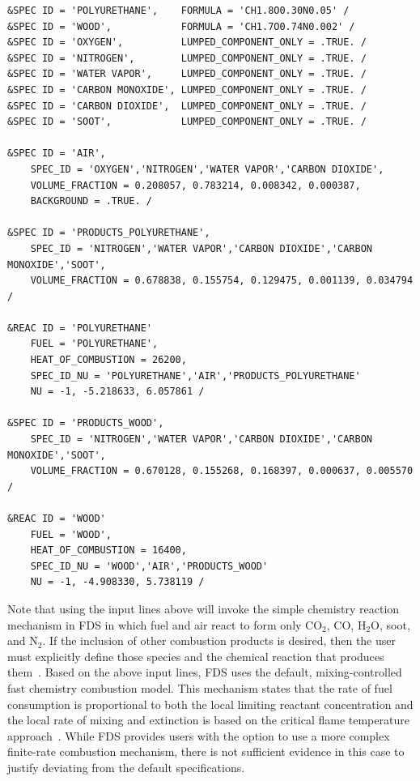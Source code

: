 \documentclass[12pt,oneside]{book}
\begin{document}
\begin{lstlisting}[basicstyle=\ttfamily\scriptsize]
&SPEC ID = 'POLYURETHANE',    FORMULA = 'CH1.8O0.30N0.05' /
&SPEC ID = 'WOOD',            FORMULA = 'CH1.7O0.74N0.002' /
&SPEC ID = 'OXYGEN',          LUMPED_COMPONENT_ONLY = .TRUE. /
&SPEC ID = 'NITROGEN',        LUMPED_COMPONENT_ONLY = .TRUE. /
&SPEC ID = 'WATER VAPOR',     LUMPED_COMPONENT_ONLY = .TRUE. /
&SPEC ID = 'CARBON MONOXIDE', LUMPED_COMPONENT_ONLY = .TRUE. /
&SPEC ID = 'CARBON DIOXIDE',  LUMPED_COMPONENT_ONLY = .TRUE. /
&SPEC ID = 'SOOT',            LUMPED_COMPONENT_ONLY = .TRUE. /

&SPEC ID = 'AIR',
    SPEC_ID = 'OXYGEN','NITROGEN','WATER VAPOR','CARBON DIOXIDE',
    VOLUME_FRACTION = 0.208057, 0.783214, 0.008342, 0.000387,
    BACKGROUND = .TRUE. /

&SPEC ID = 'PRODUCTS_POLYURETHANE',
    SPEC_ID = 'NITROGEN','WATER VAPOR','CARBON DIOXIDE','CARBON MONOXIDE','SOOT',
    VOLUME_FRACTION = 0.678838, 0.155754, 0.129475, 0.001139, 0.034794 /

&REAC ID = 'POLYURETHANE'
    FUEL = 'POLYURETHANE',
    HEAT_OF_COMBUSTION = 26200,
    SPEC_ID_NU = 'POLYURETHANE','AIR','PRODUCTS_POLYURETHANE'
    NU = -1, -5.218633, 6.057861 /

&SPEC ID = 'PRODUCTS_WOOD',
    SPEC_ID = 'NITROGEN','WATER VAPOR','CARBON DIOXIDE','CARBON MONOXIDE','SOOT',
    VOLUME_FRACTION = 0.670128, 0.155268, 0.168397, 0.000637, 0.005570 /

&REAC ID = 'WOOD'
    FUEL = 'WOOD',
    HEAT_OF_COMBUSTION = 16400,
    SPEC_ID_NU = 'WOOD','AIR','PRODUCTS_WOOD'
    NU = -1, -4.908330, 5.738119 /
\end{lstlisting}

Note that using the input lines above will invoke the simple chemistry reaction mechanism in FDS in which fuel and air react to form only CO$_2$, CO, H$_2$O, soot, and N$_2$. If the inclusion of other combustion products is desired, then the user must explicitly define those species and the chemical reaction that produces them~\cite{FDS_Users_Guide}. Based on the above input lines, FDS uses the default, mixing-controlled fast chemistry combustion model. This mechanism states that the rate of fuel consumption is proportional to both the local limiting reactant concentration and the local rate of mixing and extinction is based on the critical flame temperature approach~\cite{FDS_Math_Guide}. While FDS provides users with the option to use a more complex finite-rate combustion mechanism, there is not sufficient evidence in this case to justify deviating from the default specifications.
\end{document}
